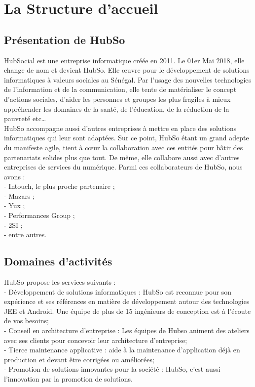 \chapter{La Structure d'accueil}

\section{Présentation de HubSo}

HubSocial est une entreprise informatique créée en 2011. Le 01er Mai 2018, elle change de nom et devient HubSo. Elle œuvre pour le développement de solutions informatiques à valeurs sociales au Sénégal. Par l’usage des nouvelles technologies de l'information et de la communication, elle tente de matérialiser le concept d’actions sociales, d’aider les personnes et groupes les plus fragiles à mieux appréhender les domaines de la santé, de l’éducation, de la réduction de la pauvreté etc… \\
HubSo accompagne aussi d'autres entreprises à mettre en place des solutions informatiques qui leur sont adaptées. Sur ce point, HubSo étant un grand adepte du manifeste agile, tient à cœur la collaboration avec ces entités pour bâtir des partenariats solides plus que tout. De même, elle collabore aussi avec d'autres entreprises de services du numérique. Parmi ces collaborateurs de HubSo, nous avons : \\
- Intouch, le plus proche partenaire ;\\
- Mazars ;\\ 
- Yux ;\\
- Performances Group ;\\
- 2SI ;\\
- entre autres.

\section{Domaines d'activités}

HubSo propose les services suivants : \\
- Développement de solutions informatiques : HubSo est reconnue pour son expérience et ses références en matière de développement autour des technologies JEE et Android. Une équipe de plus de 15 ingénieurs de conception est à l'écoute de vos besoins; \\
- Conseil en architecture d'entreprise : Les équipes de Hubso animent des ateliers avec ses clients  pour concevoir leur architecture d'entreprise; \\
- Tierce maintenance applicative : aide à la maintenance d'application déjà en production et devant être corrigées ou améliorées; \\
- Promotion de solutions innovantes pour la société : HubSo, c'est aussi l'innovation par la promotion de solutions.\\

